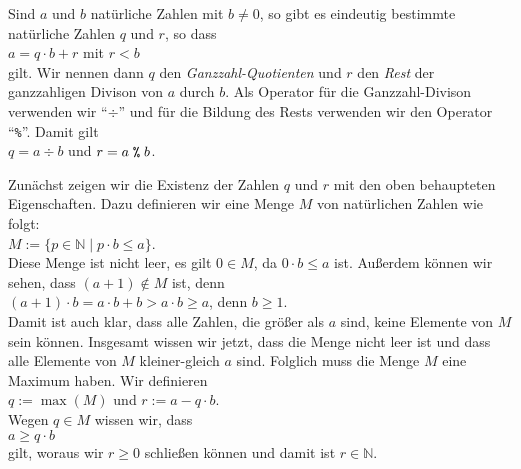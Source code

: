 \begin{Satz}
  \label{satz:division_mit_rest}
  Sind $a$ und $b$ natürliche Zahlen mit $b \not= 0$, so gibt es eindeutig bestimmte natürliche Zahlen 
  $q$ und $r$, so dass 
  \\[0.2cm]
  \hspace*{1.3cm}
  $a = q \cdot b + r$ \quad mit $r < b$
  \\[0.2cm]
  gilt.  Wir nennen dann $q$ den \emph{Ganzzahl-Quotienten} und $r$ den \emph{Rest} der ganzzahligen
  Divison von $a$ durch $b$.  Als Operator für die Ganzzahl-Divison verwenden wir ``$\div$''
  und für die Bildung des Rests verwenden wir den Operator ``\texttt{\%}''.
  Damit gilt 
  \\[0.2cm]
  \hspace*{1.3cm}
  $q = a \div b$ \quad und \quad $r = a \;\texttt{\%}\; b$.
\end{Satz}  

\proof
Zunächst zeigen wir die Existenz der Zahlen $q$ und $r$ mit den oben behaupteten Eigenschaften.
Dazu definieren wir eine Menge $M$ von natürlichen Zahlen wie folgt:
\\[0.2cm]
\hspace*{1.3cm}
$M := \{ p \in \mathbb{N} \mid p \cdot b \leq a \}$.
\\[0.2cm]
Diese Menge ist nicht leer, es gilt $0 \in M$, da $0 \cdot b \leq a$ ist.
Außerdem können wir sehen, dass $(a+1) \not\in M$ ist, denn
\\[0.2cm]
\hspace*{1.3cm}
$(a+1) \cdot b = a \cdot b + b > a \cdot b \geq a$, \quad denn $b \geq 1$.
\\[0.2cm]
Damit ist auch klar, dass alle Zahlen, die größer als $a$ sind, keine Elemente
von $M$ sein können.  Insgesamt wissen wir jetzt, dass die Menge nicht leer ist und dass alle
Elemente von $M$ kleiner-gleich $a$ sind.  Folglich muss die Menge $M$ eine Maximum haben.
Wir definieren
\\[0.2cm]
\hspace*{1.3cm}
$q := \max(M)$ \quad und \quad $r := a - q \cdot b$.
\\[0.2cm]
Wegen $q \in M$ wissen wir, dass
\\[0.2cm]
\hspace*{1.3cm}
$a \geq q \cdot b$
\\[0.2cm]
gilt, woraus wir $r \geq 0$ schließen können und damit ist $r \in \mathbb{N}$.

